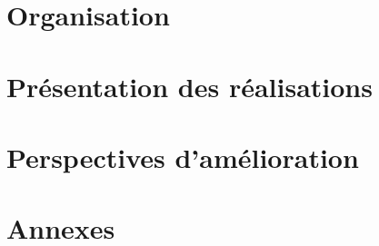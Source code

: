 \documentclass[12pt,fleqn]{book} %
\begin{document}
\part{Organisation}




\part{Présentation des réalisations}




\part{Perspectives d'amélioration}





\appendix
\part{Annexes}
 

\backmatter %

%
%
%

\cleardoublepage
{}
\setlength{\columnsep}{0.75cm}
\label{sec:index}
\printindex

\cleardoublepage
{}
\setlength{\columnsep}{0.75cm}
\printglossaries

\end{document}
